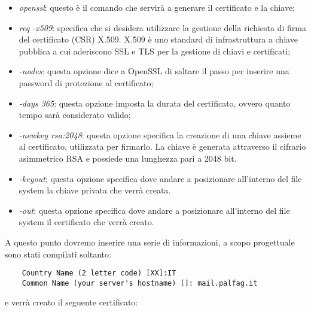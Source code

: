 \begin{itemize}
    \item \textit{openssl}: questo è il comando che servirà a generare il certificato e la chiave;
    \item \textit{req -x509}: specifica che si desidera utilizzare la gestione della richiesta di firma del certificato 
    (CSR) X.509. X.509 è uno standard di infrastruttura a chiave pubblica a cui aderiscono SSL e TLS per la gestione 
    di chiavi e certificati;
    \item \textit{-nodes}: questa opzione dice a OpenSSL di saltare il passo per inserire una password di protezione al certificato;
    \item \textit{-days 365}: questa opzione imposta la durata del certificato, ovvero quanto tempo sarà considerato
    valido;
    \item \textit{-newkey rsa:2048}: questa opzione specifica la creazione di una chiave assieme al certificato, 
    utilizzata per firmarlo. La chiave è generata attraverso il cifrario asimmetrico RSA 
    e possiede una lunghezza pari a 2048 bit.
    \item \textit{-keyout}: questa opzione specifica dove andare a posizionare all’interno del 
    file system la chiave privata che verrà creata.
    \item \textit{-out}: questa opzione specifica dove andare a posizionare all’interno del file system il certificato che verrà creato.
\end{itemize}

A questo punto dovremo inserire una serie di informazioni, a scopo progettuale sono stati compilati soltanto:

\begin{verbatim}
    Country Name (2 letter code) [XX]:IT
    Common Name (your server's hostname) []: mail.palfag.it
\end{verbatim}

e verrà creato il seguente certificato:

